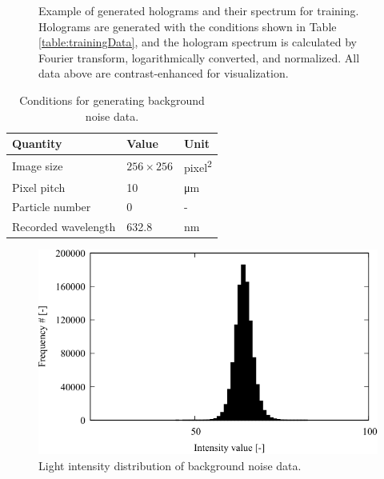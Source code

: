 \begin{figure}[H]
    \caption{Example of generated holograms and their spectrum for training. Holograms are generated with the conditions shown in Table \ref{table:trainingData}, and the hologram spectrum is calculated by Fourier transform, logarithmically converted, and normalized. All data above are contrast-enhanced for visualization.} 
    \label{fig:trainingData}
\end{figure}



\begin{table}[H]
    \centering
    \caption{Conditions for generating background noise data.}
    \label{table:backgroundnoisecondition}
    \begin{tabular}{lll}
    Quantity & Value & Unit \\ \hline \hline
    Image size & $\num{256} \times \num{256}$ & \si{pixel\squared} \\ \hline
    Pixel pitch & \num{10} & \si{\um} \\ \hline
    Particle number & 0 & - \\ \hline
    Recorded wavelength & \num{632.8} & \si{\nm} \\ \hline
    \end{tabular}
\end{table}

\begin{figure}[H]
    \centering
    \includegraphics[width=0.8\linewidth]{./Figure/3_Methods/noisehistogram.pdf}
    \caption{Light intensity distribution of background noise data.}
    \label{fig:backgroundnoise}
\end{figure}

